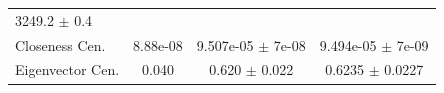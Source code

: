 \documentclass[12pt,twoside]{amherstthesis}
\begin{document}
\begin{longtable}[]{@{}lccc@{}}
\begin{minipage}[t]{0.29\columnwidth}
  3249.2 \(\pm\) 0.4\strut
  \end{minipage}\tabularnewline
  \begin{minipage}[t]{0.18\columnwidth}\raggedright\strut
  Closeness Cen.\strut
  \end{minipage} & \begin{minipage}[t]{0.13\columnwidth}\centering\strut
  8.88e-08\strut
  \end{minipage} & \begin{minipage}[t]{0.29\columnwidth}\centering\strut
  9.507e-05 \(\pm\) 7e-08\strut
  \end{minipage} & \begin{minipage}[t]{0.29\columnwidth}\centering\strut
  9.494e-05 \(\pm\) 7e-09\strut
  \end{minipage}\tabularnewline
  \begin{minipage}[t]{0.18\columnwidth}\raggedright\strut
  Eigenvector Cen.\strut
  \end{minipage} & \begin{minipage}[t]{0.13\columnwidth}\centering\strut
  0.040\strut
  \end{minipage} & \begin{minipage}[t]{0.29\columnwidth}\centering\strut
  0.620 \(\pm\) 0.022\strut
  \end{minipage} & \begin{minipage}[t]{0.29\columnwidth}\centering\strut
  0.6235 \(\pm\) 0.0227\strut
  \end{minipage}\tabularnewline
  \bottomrule
  \end{longtable}
  
\end{document}
